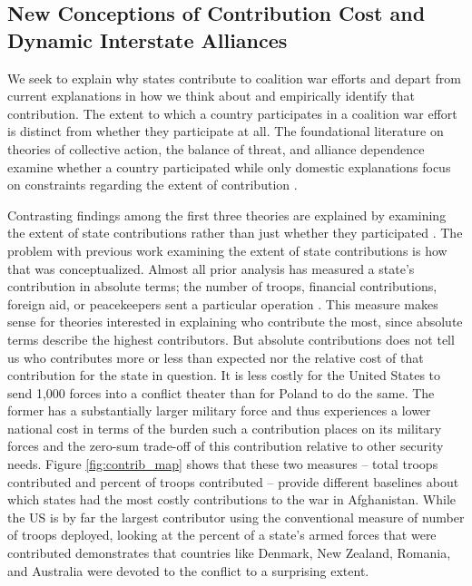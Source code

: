 \documentclass[12pt,letterpaper]{article}
\begin{document}
	\subsection{New Conceptions of Contribution Cost and Dynamic Interstate Alliances}
		We seek to explain why states contribute to coalition war efforts and depart from current explanations in how we think about and empirically identify that contribution. The extent to which a country participates in a coalition war effort is distinct from whether they participate at all. The foundational literature on theories of collective action, the balance of threat, and alliance dependence examine whether a country participated while only domestic explanations focus on constraints regarding the extent of contribution \citep{bennett_burdensharingpersiangulf_1994}.
	
		Contrasting findings among the first three theories are explained by examining the extent of state contributions rather than just whether they participated \citep{cranmer_coalitionqualitymultinational_2017}. The problem with previous work examining the extent of state contributions is how that was conceptualized. Almost all prior analysis has measured a state's contribution in absolute terms; the number of troops, financial contributions, foreign aid, or peacekeepers sent a particular operation \citep{mello_democraticparticipationarmed_2014, haesebrouck_explainingmemberstates_2016}. This measure makes sense for theories interested in explaining who contribute the most, since absolute terms describe the highest contributors. But absolute contributions does not tell us who contributes more or less than expected nor the relative cost of that contribution for the state in question. It is less costly for the United States to send 1,000 forces into a conflict theater than for Poland to do the same. The former has a substantially larger military force and thus experiences a lower national cost in terms of the burden such a contribution places on its military forces and the zero-sum trade-off of this contribution relative to other security needs. Figure \ref{fig:contrib_map} shows that these two measures -- total troops contributed and percent of troops contributed -- provide different baselines about which states had the most costly contributions to the war in Afghanistan. While the US is by far the largest contributor using the conventional measure of number of troops deployed, looking at the percent of a state's armed forces that were contributed demonstrates that countries like Denmark, New Zealand, Romania, and Australia were devoted to the conflict to a surprising extent.
\end{document}
